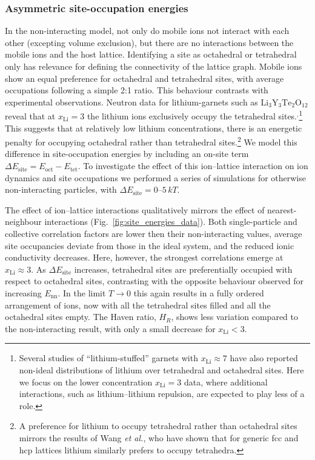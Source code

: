 \documentclass[aps,prb,twocolumn,superscriptaddress,reprint]{revtex4-1}
\newcommand{\xLi}{x_\m{Li}}
\newcommand{\m}[1]{\mathrm{#1}}
\newcommand{\chem}[1]{\ensuremath{\mathrm{#1}}}
\begin{document}
\subsubsection{Asymmetric site-occupation energies}
In the non-interacting model, not only do mobile ions not interact with each other (excepting volume exclusion), but there are no interactions between the mobile ions and the host lattice. Identifying a site as octahedral or tetrahedral only has relevance for defining the connectivity of the lattice graph. Mobile ions show an equal preference for octahedral and tetrahedral sites, with average occupations following a simple 2:1 ratio. This behaviour contrasts with experimental observations. Neutron data for lithium-garnets such as \chem{Li_3Y_3Te_2O_{12}} reveal that at $\xLi=3$ the lithium ions exclusively occupy the tetrahedral sites.\cite{OCallaghanEtAl_ChemMater2006}$^,$\footnote{Several studies of ``lithium-stuffed'' garnets with $\xLi\approx7$ have also reported non-ideal distributions of lithium over tetrahedral and octahedral sites.\cite{XieEtAl_ChemMater2011} Here we focus on the lower concentration $\xLi=3$ data, where additional interactions, such as lithium--lithium repulsion, are expected to play less of a role.} 
This suggests that at relatively low lithium concentrations, there is an energetic penalty for occupying octahedral rather than tetrahedral sites.\footnote{A preference for lithium to occupy tetrahedral rather than octahedral sites mirrors the results of Wang \emph{et al.}, who have shown that for generic fcc and hcp lattices lithium similarly prefers to occupy tetrahedra.\cite{WangEtAl_NatMater2015}}
We model this difference in site-occupation energies by including an on-site term $\Delta E_\m{site} = E_\m{oct} - E_\m{tet}$. To investigate the effect of this ion--lattice interaction on ion dynamics and site occupations we performed a series of simulations for otherwise non-interacting particles, with $\Delta E_\m{site}=0$--$5\,kT$.

The effect of ion--lattice interactions qualitatively mirrors the effect of nearest-neighbour interactions (Fig.~\ref{fig:site_energies_data}). Both single-particle and collective correlation factors are lower then their non-interacting values, average site occupancies deviate from those in the ideal system, and the reduced ionic conductivity decreases. Here, however, the strongest correlations emerge at $\xLi\approx3$. As $\Delta E_\m{site}$ increases, tetrahedral sites are preferentially occupied with respect to octahedral sites, contrasting with the opposite behaviour observed for increasing $E_\mathrm{nn}$. In the limit $T\to0$ this again results in a fully ordered arrangement of ions, now with all the tetrahedral sites filled and all the octahedral sites empty. The Haven ratio, $H_R$, shows less variation compared to the non-interacting result, with only a small decrease for $\xLi<3$.
\end{document}
